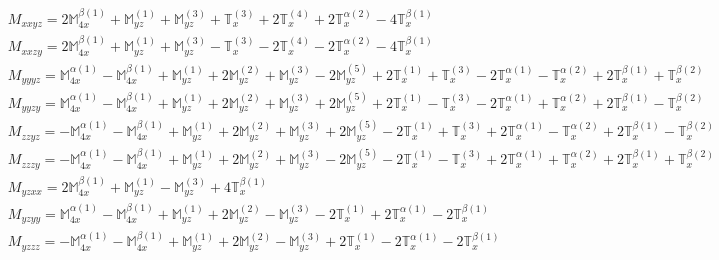 \documentclass[fleqn,8pt,landscape]{jsarticle}
\begin{document}
\begin{align*}
& M_{xxyz} = 2 \mathbb{M}_{4x}^{\beta(1)} + \mathbb{M}_{yz}^{(1)} + \mathbb{M}_{yz}^{(3)} + \mathbb{T}_{x}^{(3)} + 2 \mathbb{T}_{x}^{(4)} + 2 \mathbb{T}_{x}^{\alpha(2)} - 4 \mathbb{T}_{x}^{\beta(1)} \\
& M_{xxzy} = 2 \mathbb{M}_{4x}^{\beta(1)} + \mathbb{M}_{yz}^{(1)} + \mathbb{M}_{yz}^{(3)} - \mathbb{T}_{x}^{(3)} - 2 \mathbb{T}_{x}^{(4)} - 2 \mathbb{T}_{x}^{\alpha(2)} - 4 \mathbb{T}_{x}^{\beta(1)} \\
& M_{yyyz} = \mathbb{M}_{4x}^{\alpha(1)} - \mathbb{M}_{4x}^{\beta(1)} + \mathbb{M}_{yz}^{(1)} + 2 \mathbb{M}_{yz}^{(2)} + \mathbb{M}_{yz}^{(3)} - 2 \mathbb{M}_{yz}^{(5)} + 2 \mathbb{T}_{x}^{(1)} + \mathbb{T}_{x}^{(3)} - 2 \mathbb{T}_{x}^{\alpha(1)} - \mathbb{T}_{x}^{\alpha(2)} + 2 \mathbb{T}_{x}^{\beta(1)} + \mathbb{T}_{x}^{\beta(2)} \\
& M_{yyzy} = \mathbb{M}_{4x}^{\alpha(1)} - \mathbb{M}_{4x}^{\beta(1)} + \mathbb{M}_{yz}^{(1)} + 2 \mathbb{M}_{yz}^{(2)} + \mathbb{M}_{yz}^{(3)} + 2 \mathbb{M}_{yz}^{(5)} + 2 \mathbb{T}_{x}^{(1)} - \mathbb{T}_{x}^{(3)} - 2 \mathbb{T}_{x}^{\alpha(1)} + \mathbb{T}_{x}^{\alpha(2)} + 2 \mathbb{T}_{x}^{\beta(1)} - \mathbb{T}_{x}^{\beta(2)} \\
& M_{zzyz} = - \mathbb{M}_{4x}^{\alpha(1)} - \mathbb{M}_{4x}^{\beta(1)} + \mathbb{M}_{yz}^{(1)} + 2 \mathbb{M}_{yz}^{(2)} + \mathbb{M}_{yz}^{(3)} + 2 \mathbb{M}_{yz}^{(5)} - 2 \mathbb{T}_{x}^{(1)} + \mathbb{T}_{x}^{(3)} + 2 \mathbb{T}_{x}^{\alpha(1)} - \mathbb{T}_{x}^{\alpha(2)} + 2 \mathbb{T}_{x}^{\beta(1)} - \mathbb{T}_{x}^{\beta(2)} \\
& M_{zzzy} = - \mathbb{M}_{4x}^{\alpha(1)} - \mathbb{M}_{4x}^{\beta(1)} + \mathbb{M}_{yz}^{(1)} + 2 \mathbb{M}_{yz}^{(2)} + \mathbb{M}_{yz}^{(3)} - 2 \mathbb{M}_{yz}^{(5)} - 2 \mathbb{T}_{x}^{(1)} - \mathbb{T}_{x}^{(3)} + 2 \mathbb{T}_{x}^{\alpha(1)} + \mathbb{T}_{x}^{\alpha(2)} + 2 \mathbb{T}_{x}^{\beta(1)} + \mathbb{T}_{x}^{\beta(2)} \\
& M_{yzxx} = 2 \mathbb{M}_{4x}^{\beta(1)} + \mathbb{M}_{yz}^{(1)} - \mathbb{M}_{yz}^{(3)} + 4 \mathbb{T}_{x}^{\beta(1)} \\
& M_{yzyy} = \mathbb{M}_{4x}^{\alpha(1)} - \mathbb{M}_{4x}^{\beta(1)} + \mathbb{M}_{yz}^{(1)} + 2 \mathbb{M}_{yz}^{(2)} - \mathbb{M}_{yz}^{(3)} - 2 \mathbb{T}_{x}^{(1)} + 2 \mathbb{T}_{x}^{\alpha(1)} - 2 \mathbb{T}_{x}^{\beta(1)} \\
& M_{yzzz} = - \mathbb{M}_{4x}^{\alpha(1)} - \mathbb{M}_{4x}^{\beta(1)} + \mathbb{M}_{yz}^{(1)} + 2 \mathbb{M}_{yz}^{(2)} - \mathbb{M}_{yz}^{(3)} + 2 \mathbb{T}_{x}^{(1)} - 2 \mathbb{T}_{x}^{\alpha(1)} - 2 \mathbb{T}_{x}^{\beta(1)} \\

\end{align*}
\end{document}
